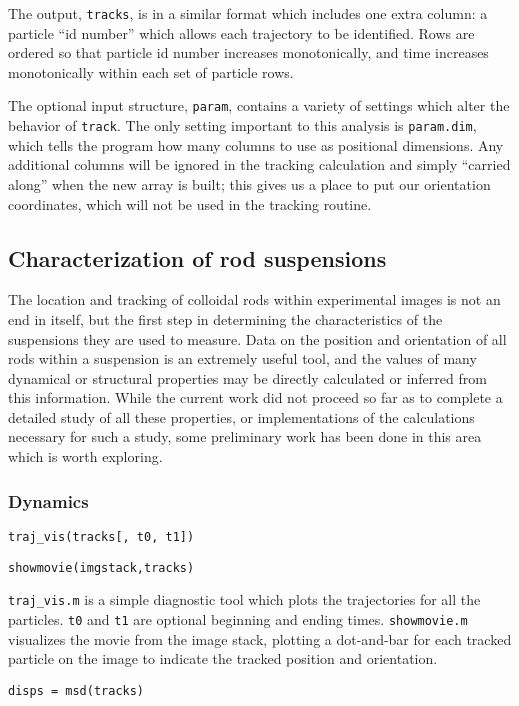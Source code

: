 The output, \texttt{tracks}, is in a similar format which includes one extra column: a particle ``id number'' which
allows each trajectory to be identified. Rows are ordered so that particle id number increases monotonically, and
time increases monotonically within each set of particle rows.

The optional input structure, \texttt{param}, contains a variety of settings which alter the behavior of 
\texttt{track}.  The only setting important to this analysis is \texttt{param.dim}, which tells the program how
many columns to use as positional dimensions. Any additional columns will be ignored in the tracking calculation and 
simply ``carried along'' when the new array is built; this gives us a place to put our orientation coordinates, which
will not be used in the tracking routine.

\subsection{Characterization of rod suspensions}

The location and tracking of colloidal rods within experimental images is not an end in itself, but the
first step in determining the characteristics of the suspensions they are used to measure.  Data on the 
position and orientation of all rods within a suspension is an extremely useful tool, and the values of many
dynamical or structural properties may be directly calculated or inferred from this information.
While the current work did not proceed so far as to complete a detailed study of all these properties, or 
implementations of the calculations necessary for such a study, some preliminary work has been done in this
area which is worth exploring.

\subsubsection{Dynamics}

\texttt{traj\_vis(tracks[, t0, t1])}

\texttt{showmovie(imgstack,tracks)}

\texttt{traj\_vis.m} is a simple diagnostic tool which plots the trajectories for all the particles. 
\texttt{t0} and \texttt{t1} are optional beginning and ending times.  \texttt{showmovie.m} visualizes the
movie from the image stack, plotting a dot-and-bar for each tracked particle on the image to indicate 
the tracked position and orientation.

\texttt{disps = msd(tracks)}

